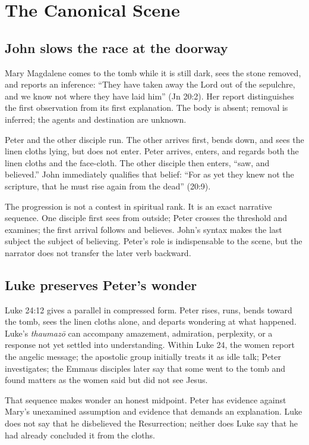 \section{The Canonical Scene}

\subsection{John slows the race at the doorway}

Mary Magdalene comes to the tomb while it is still dark, sees the stone
removed, and reports an inference: ``They have taken away the Lord out of the
sepulchre, and we know not where they have laid him'' (Jn 20:2). Her report
distinguishes the first observation from its first explanation. The body is
absent; removal is inferred; the agents and destination are unknown.

Peter and the other disciple run. The other arrives first, bends down, and sees
the linen cloths lying, but does not enter. Peter arrives, enters, and regards
both the linen cloths and the face-cloth. The other disciple then enters,
``saw, and believed.'' John immediately qualifies that belief: ``For as yet
they knew not the scripture, that he must rise again from the dead'' (20:9).

The progression is not a contest in spiritual rank. It is an exact narrative
sequence. One disciple first sees from outside; Peter crosses the threshold and
examines; the first arrival follows and believes. John's syntax makes the last
subject the subject of believing. Peter's role is indispensable to the scene,
but the narrator does not transfer the later verb backward.

\subsection{Luke preserves Peter's wonder}

Luke 24:12 gives a parallel in compressed form. Peter rises, runs, bends toward
the tomb, sees the linen cloths alone, and departs wondering at what happened.
Luke's \emph{thaumaz\=o} can accompany amazement, admiration, perplexity, or a
response not yet settled into understanding. Within Luke 24, the women report
the angelic message; the apostolic group initially treats it as idle talk;
Peter investigates; the Emmaus disciples later say that some went to the tomb
and found matters as the women said but did not see Jesus.

That sequence makes wonder an honest midpoint. Peter has evidence against
Mary's unexamined assumption and evidence that demands an explanation. Luke
does not say that he disbelieved the Resurrection; neither does Luke say that
he had already concluded it from the cloths.

